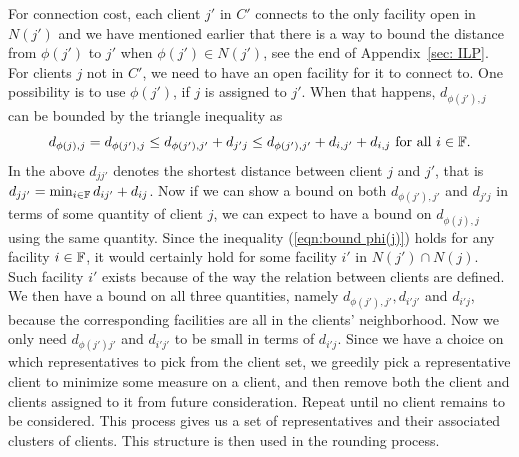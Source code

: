 \documentclass[oneside,final]{ucr}
\begin{document}
For connection cost, each client $j'$ in $C'$ connects to
the only facility open in $N(j')$ and we have mentioned
earlier that there is a way to bound the distance from
$\phi(j')$ to $j'$ when $\phi(j') \in N(j')$, see the end of
Appendix~\ref{sec: ILP}. For clients $j$ not in $C'$, we
need to have an open facility for it to connect to. One
possibility is to use $\phi(j')$, if $j$ is assigned to
$j'$. When that happens, $d_{\phi(j'), j}$ can be bounded by
the triangle inequality as
\begin{equation}
  \label{eqn:bound phi(j)}
  d_{\phi(j),j} = d_{\phi(j'), j} \leq d_{\phi(j'), j'} + d_{j'j} \leq
  d_{\phi(j'), j'} + d_{i,j'} + d_{i,j} \text{ for all } i
  \in \mathbb{F}.
\end{equation}
In the above $d_{jj'}$ denotes the shortest distance between
client $j$ and $j'$, that is $d_{jj'} = \min_{i\in\mathbb{F}}
d_{ij'} + d_{ij}$. Now if we can show a bound on both
$d_{\phi(j'),j'}$ and $d_{j'j}$ in terms of some quantity of
client $j$, we can expect to have a bound on $d_{\phi(j),j}$
using the same quantity. Since the inequality
(\ref{eqn:bound phi(j)}) holds for any facility $i \in
\mathbb{F}$, it would certainly hold for some facility $i'$
in $N(j') \cap N(j)$. Such facility $i'$ exists because of
the way the relation between clients are defined. We then
have a bound on all three quantities, namely $d_{\phi(j'),
  j'}, d_{i'j'}$ and $d_{i'j}$, because the corresponding
facilities are all in the clients' neighborhood. Now we only
need $d_{\phi(j') j'}$ and $d_{i'j'}$ to be small in terms
of $d_{i'j}$. Since we have a choice on which
representatives to pick from the client set, we greedily
pick a representative client to minimize some measure on a
client, and then remove both the client and clients assigned
to it from future consideration. Repeat until no client
remains to be considered. This process gives us a set of
representatives and their associated clusters of
clients. This structure is then used in the rounding
process.
\end{document}
